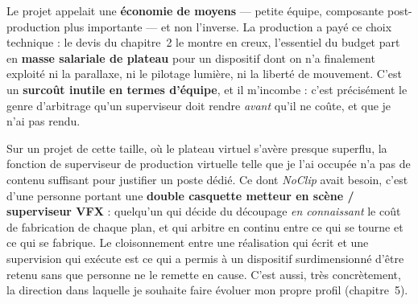 \documentclass[11pt,a4paper]{report}
\begin{document}
Le projet appelait une \textbf{économie de moyens} --- petite équipe, composante post-production
plus importante --- et non l'inverse. La production a payé ce choix technique : le devis du
chapitre~2 le montre en creux, l'essentiel du budget part en \textbf{masse salariale de plateau}
pour un dispositif dont on n'a finalement exploité ni la parallaxe, ni le pilotage lumière, ni la
liberté de mouvement. C'est un \textbf{surcoût inutile en termes d'équipe}, et il m'incombe :
c'est précisément le genre d'arbitrage qu'un superviseur doit rendre \emph{avant} qu'il ne coûte,
et que je n'ai pas rendu.

\begin{infobox}[title={Corollaire : la double casquette réalisation / supervision VFX}]
Sur un projet de cette taille, où le plateau virtuel s'avère presque superflu, la fonction de
superviseur de production virtuelle telle que je l'ai occupée n'a pas de contenu suffisant pour
justifier un poste dédié. Ce dont \textit{NoClip} avait besoin, c'est d'une personne portant une
\textbf{double casquette metteur en scène / superviseur VFX} : quelqu'un qui décide du
découpage \emph{en connaissant} le coût de fabrication de chaque plan, et qui arbitre en continu
entre ce qui se tourne et ce qui se fabrique. Le cloisonnement entre une réalisation qui écrit et
une supervision qui exécute est ce qui a permis à un dispositif surdimensionné d'être retenu
sans que personne ne le remette en cause. C'est aussi, très concrètement, la direction dans
laquelle je souhaite faire évoluer mon propre profil (chapitre~5).
\end{infobox}
\end{document}
